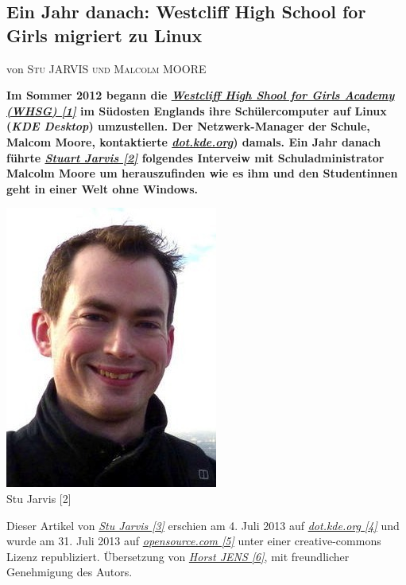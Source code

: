 \documentclass[10pt,a4paper,ngerman,twoside]{article} %
\newcommand{\NewsItem}[1]{ %
\usefont{T1}{fvs}{n}{n} %
\vspace{24pt}\large #1\vspace{3pt} %
\par \normalsize \normalfont}
\newcommand{\NewsAuthor}[1]{ %
\hfill von \textsc{#1} \vspace{20pt} %
\par \normalfont}
\begin{document}
\begin{multicols}{3}
\NewsItem{}
\section*{Ein Jahr danach: Westcliff High School for Girls migriert zu Linux} 
\label{westcliff}
\NewsAuthor{Stu JARVIS und Malcolm MOORE}

\textbf{Im Sommer 2012 begann die \href{http://www.whsg.info/index.php/extracurricular/it-and-software/open-source-software}{\textit{Westcliff High Shool for Girls Academy (WHSG) [1]}} im Südosten Englands ihre Schülercomputer auf Linux (\textit{KDE Desktop}) umzustellen. Der Netzwerk-Manager der Schule, Malcom Moore, kontaktierte \href{http://dot.kde.org/}{\textit{dot.kde.org}}) damals. Ein Jahr danach führte \href{http://dot.kde.org/users/stuart-jarvis}{\textit{Stuart Jarvis [2]}} folgendes Interveiw mit Schuladministrator Malcolm Moore um herauszufinden wie es ihm und den Studentinnen geht in einer Welt ohne Windows.}

\begin{center}
\includegraphics[width=0.5\linewidth]{westcliff/westcliff-stu.jpg}\\
\footnotesize{Stu Jarvis [2]}
\end{center}

Dieser Artikel von \href{http://www.asinen.org/about/}{\textit{Stu Jarvis [3]}} erschien am 4. Juli 2013 auf \href{http://dot.kde.org/2013/07/04/year-linux-desktop}{\textit{dot.kde.org [4]}} und wurde am 31. Juli 2013 auf \href{http://opensource.com/education/13/7/linux-westcliff-high-school}{\textit{opensource.com [5]}} unter einer creative-commons Lizenz republiziert. Übersetzung von \href{http://spielend-programmieren.at}{\textit{Horst JENS [6]}}, mit freundlicher Genehmigung des Autors.


\end{multicols}
\end{document}
